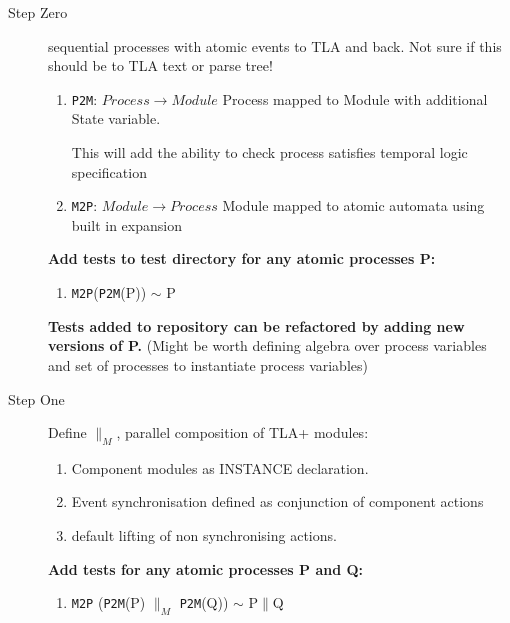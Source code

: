 \documentclass[]{article}
\begin{document}
 \begin{description}
 \item[Step Zero] sequential processes with atomic events to TLA and back. Not sure if this should be to TLA text or parse tree!

 \begin{enumerate}

 \item \verb|P2M|: $Process \rightarrow Module$ Process mapped to Module with additional State variable.

 This will add the ability to check process satisfies temporal logic specification

 \item \verb|M2P|: $Module \rightarrow Process $ Module mapped to atomic automata using built in expansion


 \end{enumerate}

   {\bf Add tests to test directory for any atomic processes P:
    \begin{enumerate}
    \item  \verb|M2P|(\verb|P2M|(P)) $\sim$ P
    \end{enumerate}
    }
    {\bf Tests added to repository can be refactored by adding new versions of P.} (Might be worth defining algebra over process variables and set of processes to instantiate process variables)

    \item[Step One] Define $\parallel_M$, parallel composition of TLA+ modules:

     \begin{enumerate}

     \item  Component modules as INSTANCE declaration.

     \item Event synchronisation defined as conjunction of component actions

     \item default lifting of non synchronising actions.



     \end{enumerate}

       {\bf Add tests for any atomic processes P and Q:
        \begin{enumerate}
        \item  \verb|M2P| (\verb|P2M|(P) $\parallel_M$ \verb|P2M|(Q)) $\sim$ P$\parallel$Q
        \end{enumerate}
        }



\end{description}
\end{document}
